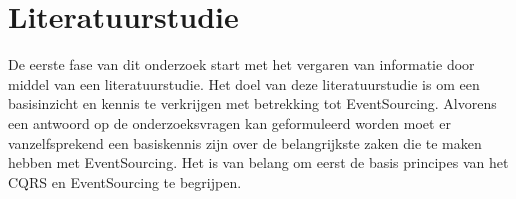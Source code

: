 \section{Literatuurstudie}
\label{sec:literatuurstudie}

De eerste fase van dit onderzoek start met het vergaren van informatie door middel van een literatuurstudie. Het doel van deze literatuurstudie is om een basisinzicht en kennis te verkrijgen met betrekking tot EventSourcing. Alvorens een antwoord op de onderzoeksvragen kan geformuleerd worden moet er vanzelfsprekend een basiskennis zijn over de belangrijkste zaken die te maken hebben met EventSourcing. Het is van belang om eerst de basis principes van het CQRS en EventSourcing te begrijpen.